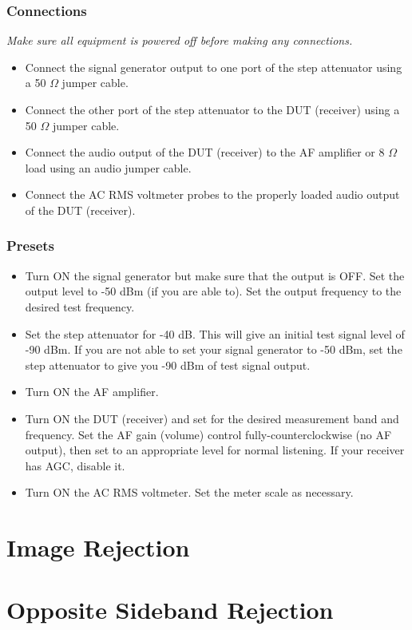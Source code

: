 \documentclass[10pt,letterpaper]{book}
\begin{document}
\subsubsection*{Connections}
\emph{Make sure all equipment is powered off before making any connections.}
\begin{itemize}
	\item Connect the signal generator output to one port of the step attenuator using a 50 $\Omega$ jumper cable.
	\item Connect the other port of the step attenuator to the DUT (receiver) using a 50 $\Omega$ jumper cable.
	\item Connect the audio output of the DUT (receiver) to the AF amplifier or 8 $\Omega$ load using an audio jumper cable.
	\item Connect the AC RMS voltmeter probes to the properly loaded audio output of the DUT (receiver).
\end{itemize}
\subsubsection*{Presets}
\begin{itemize}
	\item Turn ON the signal generator but make sure that the output is OFF. Set the output level to -50 dBm (if you are able to). Set the output frequency to the desired test frequency.
	\item Set the step attenuator for -40 dB. This will give an initial test signal level of -90 dBm. If you are not able to set your signal generator to -50 dBm, set the step attenuator to give you -90 dBm of test signal output.
	\item Turn ON the AF amplifier.
	\item Turn ON the DUT (receiver) and set for the desired measurement band and frequency. Set the AF gain (volume) control fully-counterclockwise (no AF output), then set to an appropriate level for normal listening. If your receiver has AGC, disable it.
	\item Turn ON the AC RMS voltmeter. Set the meter scale as necessary.
\end{itemize}

\section{Image Rejection}
\section{Opposite Sideband Rejection}
\end{document}
